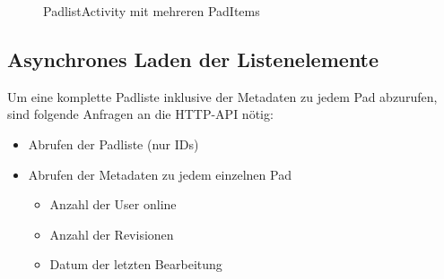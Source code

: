 \begin{figure}[h!]
    \centering
    \setlength\fboxsep{0pt}
	  \caption{PadlistActivity mit mehreren PadItems}
	  \label{fig:Padliste}
\end{figure}


\subsection{Asynchrones Laden der Listenelemente}
Um eine komplette Padliste inklusive der Metadaten zu jedem Pad abzurufen, sind folgende Anfragen an die HTTP-API nötig:
\begin{itemize}
	\item Abrufen der Padliste (nur IDs)
	\item Abrufen der Metadaten zu jedem einzelnen Pad
		\begin{itemize}
			\item Anzahl der User online
			\item Anzahl der Revisionen
			\item Datum der letzten Bearbeitung
		\end{itemize}
\end{itemize}

